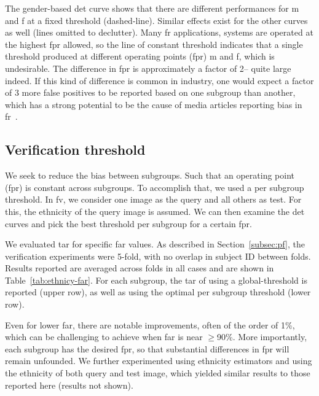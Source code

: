 The gender-based \gls{det} curve shows that there are different performances for \gls{m} and \gls{f} at a fixed threshold (dashed-line). Similar effects exist for the other curves as well (lines omitted to declutter). Many \gls{fr} applications, systems are operated at the highest \gls{fpr} allowed, so the line of constant threshold indicates that a single threshold produced at different operating points (\ie \gls{fpr}) \gls{m} and \gls{f}, which is undesirable.  The difference in \gls{fpr} is approximately a factor of 2-- quite large indeed. If this kind of difference is common in industry, one would expect a factor of 3 more false positives to be reported based on one subgroup than another, which has a strong potential to be the cause of media articles reporting bias in 
\gls{fr}~\cite{england2019,snow2018}.


\subsection{Verification threshold} \label{subsec:analysis:verification}
We seek to reduce the bias between subgroups. Such that an operating point (\ie \gls{fpr}) is constant across subgroups. To accomplish that, we used a per subgroup threshold. In \gls{fv}, we consider one image as the query and all others as test. For this, the ethnicity of the query image is assumed. We can then examine the \gls{det} curves and pick the best threshold per subgroup for a certain \gls{fpr}.

We evaluated \gls{tar} for specific \gls{far} values. As described in Section~\ref{subsec:pf}, the verification experiments were 5-fold, with no overlap in subject ID between folds. Results reported are averaged across folds in all cases and are shown in Table~\ref{tab:ethnicy-far}. For each subgroup, the \gls{tar} of using a global-threshold is reported (upper row), as well as using the optimal per subgroup threshold (lower row). 

Even for lower \gls{far}, there are notable improvements, often of the order of 1\%, which can be challenging to achieve when \gls{far} is near $\geq$90\%. More importantly, each subgroup has the desired \gls{fpr}, so that substantial differences in \gls{fpr} will remain unfounded. We further experimented using ethnicity estimators and using the ethnicity of both query and test image, which yielded similar results to those reported here (results not shown).

